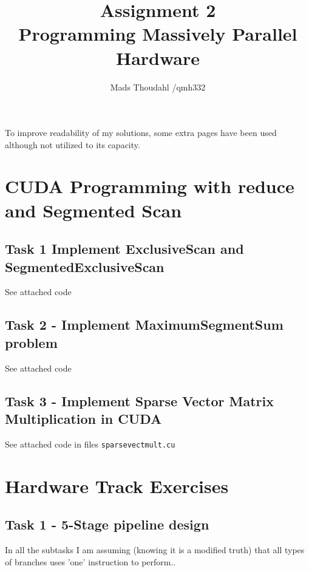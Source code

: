 \documentclass[a4paper,10pt]{article}
\title{Assignment 2  \\Programming Massively Parallel Hardware }
\author{Mads Thoudahl /qmh332}
\begin{document}
\maketitle

To improve readability of my solutions, some extra pages have been used although not utilized to its capacity.

\section{CUDA Programming with reduce and Segmented Scan}
\subsection{Task 1 Implement ExclusiveScan and SegmentedExclusiveScan}
See attached code

\subsection{Task 2 - Implement MaximumSegmentSum problem}
See attached code


\subsection{Task 3 - Implement Sparse Vector Matrix Multiplication in CUDA}
See attached code in files \texttt{sparsevectmult.cu}

\newpage

\section{Hardware Track Exercises}
\subsection{Task 1 - 5-Stage pipeline design}
In all the subtasks I am assuming (knowing it is a modified truth) that all types of branches uses 'one' instruction to perform..
\end{document}
